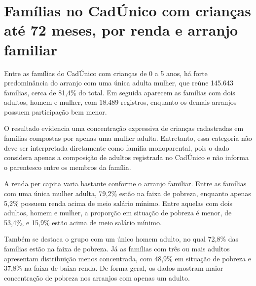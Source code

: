 \section{Famílias no CadÚnico com crianças até 72 meses, por renda e arranjo familiar}


Entre as famílias do CadÚnico com crianças de 0 a 5 anos, há forte predominância do arranjo com uma única adulta mulher, que reúne 145.643 famílias, cerca de 81,4\% do total. Em seguida aparecem as famílias com dois adultos, homem e mulher, com 18.489 registros, enquanto os demais arranjos possuem participação bem menor.

O resultado evidencia uma concentração expressiva de crianças cadastradas em famílias compostas por apenas uma mulher adulta. Entretanto, essa categoria não deve ser interpretada diretamente como família monoparental, pois o dado considera apenas a composição de adultos registrada no CadÚnico e não informa o parentesco entre os membros da família.


A renda per capita varia bastante conforme o arranjo familiar. Entre as famílias com uma única mulher adulta, 79,2\% estão na faixa de pobreza, enquanto apenas 5,2\% possuem renda acima de meio salário mínimo. Entre aquelas com dois adultos, homem e mulher, a proporção em situação de pobreza é menor, de 53,4\%, e 15,9\% estão acima de meio salário mínimo.

Também se destaca o grupo com um único homem adulto, no qual 72,8\% das famílias estão na faixa de pobreza. Já as famílias com três ou mais adultos apresentam distribuição menos concentrada, com 48,9\% em situação de pobreza e 37,8\% na faixa de baixa renda. De forma geral, os dados mostram maior concentração de pobreza nos arranjos com apenas um adulto.


